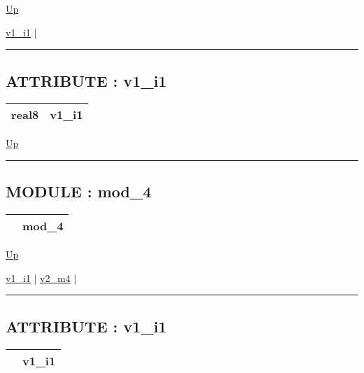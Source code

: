 \hyperlink{ecldoc:example_2}{Up}

\par


\hyperlink{ecldoc:example_2.iface_1.v1_i1}{v1\_i1}  |

\rule{\textwidth}{0.4pt}

\subsection*{ATTRIBUTE : v1\_i1}
\hypertarget{ecldoc:example_2.iface_1.v1_i1}{}

{\renewcommand{\arraystretch}{1.5}
\begin{tabularx}{\textwidth}{|>{\raggedright\arraybackslash}l|X|}
\hline
\hspace{0pt}real8 & v1\_i1 \\
\hline
\end{tabularx}
}

\hyperlink{ecldoc:example_2.iface_1}{Up}

\par


\rule{\textwidth}{0.4pt}


\subsection*{MODULE : mod\_4}
\hypertarget{ecldoc:example_2.mod_4}{}

{\renewcommand{\arraystretch}{1.5}
\begin{tabularx}{\textwidth}{|>{\raggedright\arraybackslash}l|X|}
\hline
\hspace{0pt} & mod\_4 \\
\hline
\end{tabularx}
}

\hyperlink{ecldoc:example_2}{Up}

\par


\hyperlink{ecldoc:example_2.mod_4.v1_i1}{v1\_i1}  |
\hyperlink{ecldoc:example_2.mod_4.v2_m4}{v2\_m4}  |

\rule{\textwidth}{0.4pt}

\subsection*{ATTRIBUTE : v1\_i1}
\hypertarget{ecldoc:example_2.mod_4.v1_i1}{}

{\renewcommand{\arraystretch}{1.5}
\begin{tabularx}{\textwidth}{|>{\raggedright\arraybackslash}l|X|}
\hline
\hspace{0pt} & v1\_i1 \\
\hline
\end{tabularx}
}

